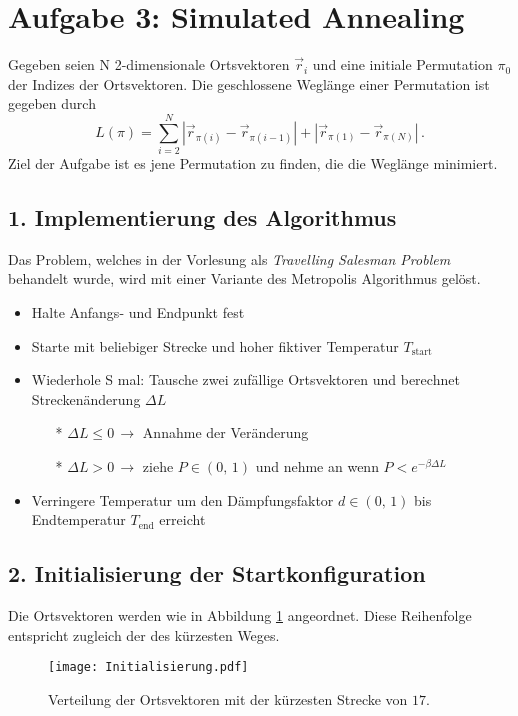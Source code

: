 \section*{Aufgabe 3: Simulated Annealing}
Gegeben seien N 2-dimensionale Ortsvektoren $\vec{r}_i$ und eine initiale Permutation $\pi_0$ der Indizes der Ortsvektoren.
Die geschlossene Weglänge einer Permutation ist gegeben durch
\begin{equation*}
L(\pi) = \sum_{i=2}^N |\vec{r}_{\pi(i)}-\vec{r}_{\pi(i-1)}| + |\vec{r}_{\pi(1)}-\vec{r}_{\pi(N)}|\, .
\end{equation*}
Ziel der Aufgabe ist es jene Permutation zu finden, die die Weglänge minimiert.

\subsection*{1. Implementierung des Algorithmus}
Das Problem, welches in der Vorlesung als \textit{Travelling Salesman Problem} behandelt wurde, wird mit einer Variante des Metropolis Algorithmus gelöst.
\begin{itemize}
\item Halte Anfangs- und Endpunkt fest
\item Starte mit beliebiger Strecke und hoher fiktiver Temperatur $T_\text{start}$
\item Wiederhole S mal: Tausche zwei zufällige Ortsvektoren und berechnet Streckenänderung $\Delta L$
\begin{itemize}
\item[*] $\Delta L \leq 0 \, \rightarrow$ Annahme der Veränderung
\item[*] $\Delta L > 0 \, \rightarrow$ ziehe $P \in (0,\,1)$ und nehme an wenn $P < e^{-\beta\Delta L}$
\end{itemize}
\item Verringere Temperatur um den Dämpfungsfaktor $d\in (0,\, 1)$ bis Endtemperatur $T_\text{end}$ erreicht
\end{itemize}

\subsection*{2. Initialisierung der Startkonfiguration}
Die Ortsvektoren werden wie in Abbildung \ref{fig:3_1} angeordnet.
Diese Reihenfolge entspricht zugleich der des kürzesten Weges.
\FloatBarrier
\begin{figure}[H]
    \centering
    \texttt{[image: Initialisierung.pdf]}
    \caption{Verteilung der Ortsvektoren mit der kürzesten Strecke von $17$.}
    \label{fig:3_1}
\end{figure}
\FloatBarrier
\noindent

